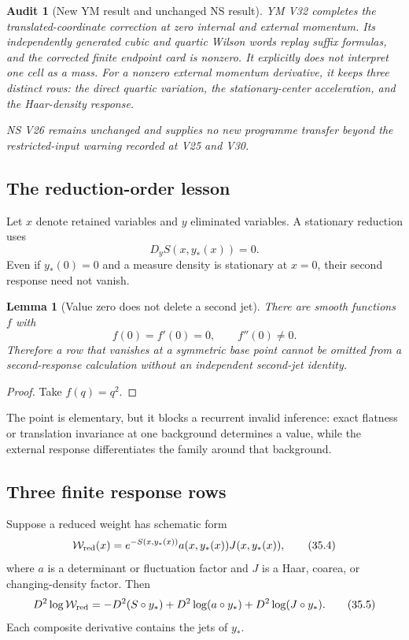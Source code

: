 \documentclass[11pt]{article}
\newtheorem{lemma}[theorem]{Lemma}
\newtheorem{audit}[theorem]{Audit}
\begin{document}
\begin{audit}[New YM result and unchanged NS result]
\label{audit:v11v35-companions}
YM V32 completes the translated-coordinate correction at zero internal
and external momentum.  Its independently generated cubic and quartic
Wilson words replay suffix formulas, and the corrected finite endpoint
card is nonzero.  It explicitly does not interpret one cell as a mass.
For a nonzero external momentum derivative, it keeps three distinct
rows: the direct quartic variation, the stationary-center acceleration,
and the Haar-density response.

NS V26 remains unchanged and supplies no new programme transfer beyond
the restricted-input warning recorded at V25 and V30.
\end{audit}

\subsection{The reduction-order lesson}

Let \(x\) denote retained variables and \(y\) eliminated variables.  A
stationary reduction uses
\[
 D_yS(x,y_*(x))=0.
 \tag{35.2}
\]
Even if \(y_*(0)=0\) and a measure density is stationary at \(x=0\),
their second response need not vanish.

\begin{lemma}[Value zero does not delete a second jet]
\label{lem:v11v35-second-jet}
There are smooth functions \(f\) with
\[
 f(0)=f'(0)=0,\qquad f''(0)\ne0.
 \tag{35.3}
\]
Therefore a row that vanishes at a symmetric base point cannot be
omitted from a second-response calculation without an independent
second-jet identity.
\end{lemma}

\begin{proof}
Take \(f(q)=q^2\).
\end{proof}

The point is elementary, but it blocks a recurrent invalid inference:
exact flatness or translation invariance at one background determines a
value, while the external response differentiates the family around
that background.

\subsection{Three finite response rows}

Suppose a reduced weight has schematic form
\[
 \mathcal W_{\rm red}(x)
 =
 e^{-S(x,y_*(x))}
 a(x,y_*(x))
 J(x,y_*(x)),
 \tag{35.4}
\]
where \(a\) is a determinant or fluctuation factor and \(J\) is a Haar,
coarea, or changing-density factor.  Then
\[
 D^2\log\mathcal W_{\rm red}
 =
 -D^2(S\circ y_*)
 +D^2\log(a\circ y_*)
 +D^2\log(J\circ y_*).
 \tag{35.5}
\]
Each composite derivative contains the jets of \(y_*\).
\end{document}
